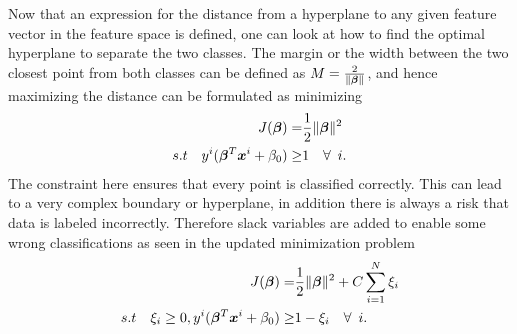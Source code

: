             Now that an expression for the distance from a hyperplane to any given feature vector in the feature space is defined, one can look at how to find the optimal hyperplane to separate the two classes. The margin or the width between the two closest point from both classes can be defined as $M = \frac{2}{\lVert\bm \beta\rVert}$, and hence maximizing the distance can be formulated as minimizing
            \begin{align}
                J(\bm \beta) = & \frac{1}{2}\lVert\bm \beta\rVert^2 \nonumber \\
                 s.t \quad y^i(\bm \beta^T\bm x^i + \beta_0) \geq & 1 \quad \forall \enspace i.
                \label{svm:cost}
            \end{align}
            The constraint here ensures that every point is classified correctly. This can lead to a very complex boundary or hyperplane, in addition there is always a risk that data is labeled incorrectly. Therefore slack variables are added to enable some wrong classifications as seen in the updated minimization problem
            \begin{align}
                J(\bm \beta) = & \frac{1}{2}\lVert\bm \beta\rVert^2  + C \sum_{i=1}^N \xi_i \nonumber \\
                 s.t \quad \xi_i \geq 0, y^i(\bm \beta^T\bm x^i + \beta_0) \geq & 1 - \xi_i \quad \forall \enspace i.
                \label{svm:cost}
            \end{align}
            
